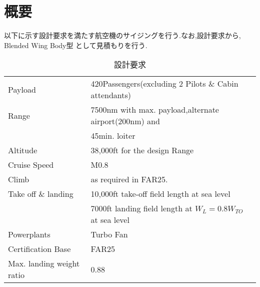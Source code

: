 \documentclass[../main]{subfiles}
\begin{document}
\section{概要}
  以下に示す設計要求を満たす航空機のサイジングを行う.なお,設計要求から, Blended Wing Body型
  として見積もりを行う.
  \begin{table}[H]
    \begin{center}
      \caption{設計要求}
      \begin{tabular}{l l} \hline
        Payload & 420Passengers(excluding 2 Pilots \& Cabin attendants) \\
        Range & 7500nm with max. payload,alternate airport(200nm) and \\
              & 45min. loiter \\
        Altitude & 38,000ft for the design Range \\
        Cruise Speed & M0.8 \\
        Climb & as required in FAR25. \\
        Take off \& landing & 10,000ft take-off field length at sea level \\
                 & 7000ft landing field length at $W_L=0.8W_{TO}$ at sea level \\
        Powerplants & Turbo Fan \\
        Certification Base & FAR25 \\
        Max. landing weight ratio & 0.88 \\  \hline
      \end{tabular}
    \end{center}
    \label{requirements}
  \end{table}
\end{document}
